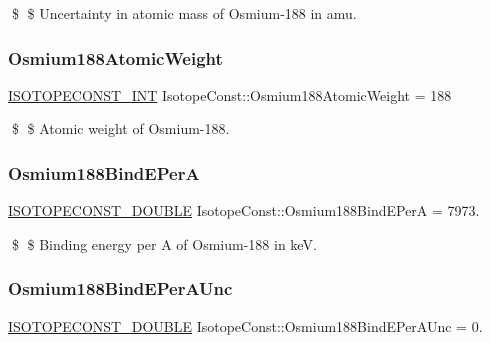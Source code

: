 \$ \$ Uncertainty in atomic mass of Osmium-\/188 in amu. \mbox{\label{group___isotope_const-_osmium-_os188_ga1305c00746875a5abf547fd299491a71}} 
\subsubsection{\texorpdfstring{Osmium188\+Atomic\+Weight}{Osmium188AtomicWeight}}
{\footnotesize\ttfamily \mbox{\hyperlink{group___isotope_const-_macros_ga5f18360b3e99483a35c32d789e62621c}{I\+S\+O\+T\+O\+P\+E\+C\+O\+N\+S\+T\+\_\+\+I\+NT}} Isotope\+Const\+::\+Osmium188\+Atomic\+Weight = 188}

\$ \$ Atomic weight of Osmium-\/188. \mbox{\label{group___isotope_const-_osmium-_os188_ga16f3aee18895a81267a6cb7e4999c33a}} 
\subsubsection{\texorpdfstring{Osmium188\+Bind\+E\+PerA}{Osmium188BindEPerA}}
{\footnotesize\ttfamily \mbox{\hyperlink{group___isotope_const-_macros_ga8f45a7272ce02c0b4c65c44636ed719a}{I\+S\+O\+T\+O\+P\+E\+C\+O\+N\+S\+T\+\_\+\+D\+O\+U\+B\+LE}} Isotope\+Const\+::\+Osmium188\+Bind\+E\+PerA = 7973.}

\$ \$ Binding energy per A of Osmium-\/188 in keV. \mbox{\label{group___isotope_const-_osmium-_os188_ga5b5cd6c34bb30ae029cdd231ad1738dc}} 
\subsubsection{\texorpdfstring{Osmium188\+Bind\+E\+Per\+A\+Unc}{Osmium188BindEPerAUnc}}
{\footnotesize\ttfamily \mbox{\hyperlink{group___isotope_const-_macros_ga8f45a7272ce02c0b4c65c44636ed719a}{I\+S\+O\+T\+O\+P\+E\+C\+O\+N\+S\+T\+\_\+\+D\+O\+U\+B\+LE}} Isotope\+Const\+::\+Osmium188\+Bind\+E\+Per\+A\+Unc = 0.}

